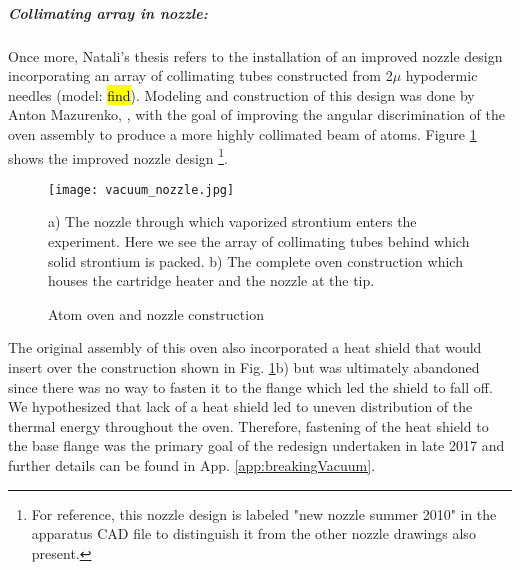 \subparagraph{Collimating array in nozzle:}
Once more, Natali's thesis refers to the installation of an improved nozzle design incorporating an array of collimating tubes constructed from 2$\mu$ hypodermic needles (model: \hl{find}). 
Modeling and construction of this design was done by Anton Mazurenko, \cite{Mazurenko2010}, with the goal of improving the angular discrimination of the oven assembly to produce a more highly collimated beam of atoms.
Figure \ref{fig:2010_nozzle} shows the improved nozzle design \footnote{For reference, this nozzle design is labeled "new nozzle summer 2010" in the apparatus CAD file to distinguish it from the other nozzle drawings also present.}.
	\begin{figure}
		\centerline{
		\texttt{[image: vacuum\_nozzle.jpg]}}
		\caption{Atom oven and nozzle construction}{a) The nozzle through which vaporized strontium enters the experiment. Here we see the array of collimating tubes behind which solid strontium is packed. b) The complete oven construction which houses the cartridge heater and the nozzle at the tip.}
		\label{fig:2010_nozzle}
	\end{figure}
The original assembly of this oven also incorporated a heat shield that would insert over the construction shown in Fig. \ref{fig:2010_nozzle}b) but was ultimately abandoned since there was no way to fasten it to the flange which led the shield to fall off.
We hypothesized that lack of a heat shield led to uneven distribution of the thermal energy throughout the oven.
Therefore, fastening of the heat shield to the base flange was the primary goal of the redesign undertaken in late 2017 and further details can be found in App. \ref{app:breakingVacuum}.  
 
